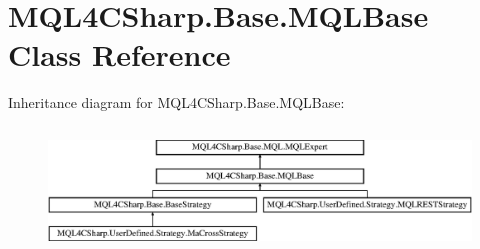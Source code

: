 \hypertarget{class_m_q_l4_c_sharp_1_1_base_1_1_m_q_l_base}{}\section{M\+Q\+L4\+C\+Sharp.\+Base.\+M\+Q\+L\+Base Class Reference}
\label{class_m_q_l4_c_sharp_1_1_base_1_1_m_q_l_base}
Inheritance diagram for M\+Q\+L4\+C\+Sharp.\+Base.\+M\+Q\+L\+Base\+:\begin{figure}[H]
\begin{center}
\leavevmode
\includegraphics[height=3.363364cm]{class_m_q_l4_c_sharp_1_1_base_1_1_m_q_l_base}
\end{center}
\end{figure}
